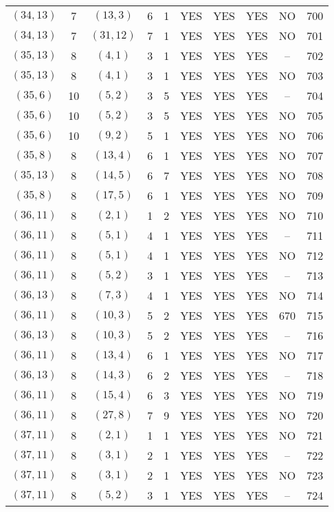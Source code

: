\begin{longtable}{|c|c|c|c|c|c|c|c|c|c|}
$(34, 13)$ & 7 & $(13, 3)$ & 6 & 1 & YES & YES & YES & NO & 700\\
$(34, 13)$ & 7 & $(31, 12)$ & 7 & 1 & YES & YES & YES & NO & 701\\
$(35, 13)$ & 8 & $(4, 1)$ & 3 & 1 & YES & YES & YES & -- & 702\\
$(35, 13)$ & 8 & $(4, 1)$ & 3 & 1 & YES & YES & YES & NO & 703\\
$(35, 6)$ & 10 & $(5, 2)$ & 3 & 5 & YES & YES & YES & -- & 704\\
$(35, 6)$ & 10 & $(5, 2)$ & 3 & 5 & YES & YES & YES & NO & 705\\
$(35, 6)$ & 10 & $(9, 2)$ & 5 & 1 & YES & YES & YES & NO & 706\\
$(35, 8)$ & 8 & $(13, 4)$ & 6 & 1 & YES & YES & YES & NO & 707\\
$(35, 13)$ & 8 & $(14, 5)$ & 6 & 7 & YES & YES & YES & NO & 708\\
$(35, 8)$ & 8 & $(17, 5)$ & 6 & 1 & YES & YES & YES & NO & 709\\
$(36, 11)$ & 8 & $(2, 1)$ & 1 & 2 & YES & YES & YES & NO & 710\\
$(36, 11)$ & 8 & $(5, 1)$ & 4 & 1 & YES & YES & YES & -- & 711\\
$(36, 11)$ & 8 & $(5, 1)$ & 4 & 1 & YES & YES & YES & NO & 712\\
$(36, 11)$ & 8 & $(5, 2)$ & 3 & 1 & YES & YES & YES & -- & 713\\
$(36, 13)$ & 8 & $(7, 3)$ & 4 & 1 & YES & YES & YES & NO & 714\\
$(36, 11)$ & 8 & $(10, 3)$ & 5 & 2 & YES & YES & YES & 670 & 715\\
$(36, 13)$ & 8 & $(10, 3)$ & 5 & 2 & YES & YES & YES & -- & 716\\
$(36, 11)$ & 8 & $(13, 4)$ & 6 & 1 & YES & YES & YES & NO & 717\\
$(36, 13)$ & 8 & $(14, 3)$ & 6 & 2 & YES & YES & YES & -- & 718\\
$(36, 11)$ & 8 & $(15, 4)$ & 6 & 3 & YES & YES & YES & NO & 719\\
$(36, 11)$ & 8 & $(27, 8)$ & 7 & 9 & YES & YES & YES & NO & 720\\
$(37, 11)$ & 8 & $(2, 1)$ & 1 & 1 & YES & YES & YES & NO & 721\\
$(37, 11)$ & 8 & $(3, 1)$ & 2 & 1 & YES & YES & YES & -- & 722\\
$(37, 11)$ & 8 & $(3, 1)$ & 2 & 1 & YES & YES & YES & NO & 723\\
$(37, 11)$ & 8 & $(5, 2)$ & 3 & 1 & YES & YES & YES & -- & 724\\

\end{longtable}
